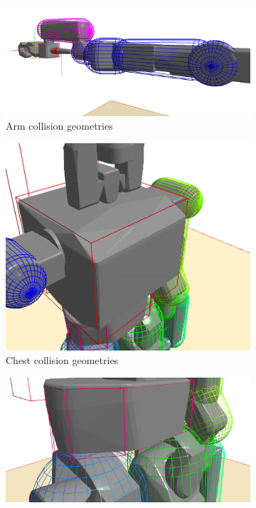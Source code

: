 \documentclass[letterpaper, 10 pt, conference]{ieeeconf}  %
\begin{document}
\begin{figure}[h]
    \centering
    \begin{subfigure}[h]{1.0\columnwidth}
        \includegraphics[width=\columnwidth]{pictures/arm_col_geom}
        \caption{Arm collision geometries}
        \label{fig:arm_col_geoms}
    \end{subfigure}
    \begin{subfigure}[h]{0.45\columnwidth}
        \includegraphics[width=\columnwidth]{pictures/chest_col_geom}
        \caption{Chest collision geometries}
        \label{fig:chest_col_geom}
    \end{subfigure}
    \begin{subfigure}[h]{0.45\columnwidth}
        \includegraphics[width=\columnwidth]{pictures/pelvis_col_geom}

\end{subfigure}
\end{figure}
\end{document}
